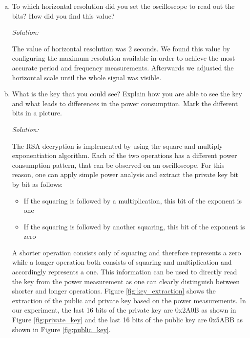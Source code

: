 \documentclass[a4paper,11pt]{article}
\newenvironment{solution}%
{\par{\noindent\small\textit{Solution:}}\vspace{-12pt}\begin{framed}}%
{\end{framed}\par}
\begin{document}
\begin{enumerate}[(a)]
\begin{solution}
\begin{center}
\end{center}
\makeatother


The method used to reduce the noise on a measured signal was signal averaging. We set up a trigger and acquired the noisy signal 512 times. The oscilloscope added up all acquisitions and divided by 512. This technique significantly reduced the level of noise as one can see when comparing the power measurement of a single signal in Figure \ref{fig:single_signal} to the averaged power measurement in Figure \ref{fig:averaged_signal}.
\end{solution}\fi



\item To which horizontal resolution did you set the oscilloscope to read out
the bits? How did you find this value?
\ifsolution\begin{solution}
The value of horizontal resolution was 2 seconds. We found this value by configuring the maximum resolution available in order to achieve the most accurate period and frequency measurements. Afterwards we adjusted the horizontal scale until the whole signal was visible.
\end{solution}\fi

\newpage
\item What is the key that you could see? Explain how you are able to
see the key and what leads to differences in the power consumption.
Mark the different bits in a picture.
\ifsolution\begin{solution}

\par The RSA decryption is implemented by using the square and multiply exponentiation algorithm. Each of the two operations has a different power consumption pattern, that can be observed on an oscilloscope. For this reason, one can apply simple power analysis and extract the private key bit by bit as follows:

\begin{itemize}
  \item If the squaring is followed by a multiplication, this bit of the exponent is one
  \item If the squaring is followed by another squaring, this bit of the exponent is zero
\end{itemize}

A shorter operation consists only of squaring and therefore represents a zero while a longer operation both consists of squaring and multiplication and accordingly represents a one. This information can be used to directly read the key from the power measurement as one can clearly distinguish between shorter and longer operations.
Figure \ref{fig:key_extraction} shows the extraction of the public and private key based on the power measurements. In our experiment, the last 16 bits of the private key are 0x2A0B as shown in Figure \ref{fig:private_key} and the last 16 bits of the public key are 0x5ABB as shown in Figure \ref{fig:public_key}.


\end{solution}
\end{enumerate}
\end{document}
